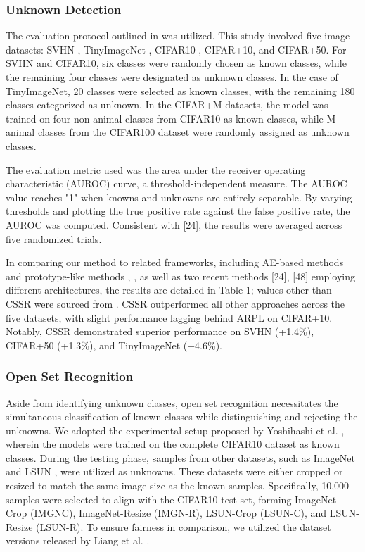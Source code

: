 \documentclass{gji}
\begin{document}
\subsubsection{Unknown Detection}
The evaluation protocol outlined in \cite{24} was utilized. This study involved five image datasets: SVHN \cite{25}, TinyImageNet \cite{30}, CIFAR10 \cite{20}, CIFAR+10, and CIFAR+50. For SVHN and CIFAR10, six classes were randomly chosen as known classes, while the remaining four classes were designated as unknown classes. In the case of TinyImageNet, 20 classes were selected as known classes, with the remaining 180 classes categorized as unknown. In the CIFAR+M datasets, the model was trained on four non-animal classes from CIFAR10 as known classes, while M animal classes from the CIFAR100 dataset \cite{20} were randomly assigned as unknown classes.

The evaluation metric used was the area under the receiver operating characteristic (AUROC) curve, a threshold-independent measure. The AUROC value reaches "1" when knowns and unknowns are entirely separable. By varying thresholds and plotting the true positive rate against the false positive rate, the AUROC was computed. Consistent with [24], the results were averaged across five randomized trials.

In comparing our method to related frameworks, including AE-based methods \cite{26} and prototype-like methods \cite{3}, \cite{42}, as well as two recent methods [24], [48] employing different architectures, the results are detailed in Table 1; values other than CSSR were sourced from \cite{48}. CSSR outperformed all other approaches across the five datasets, with slight performance lagging behind ARPL on CIFAR+10. Notably, CSSR demonstrated superior performance on SVHN (+1.4\%), CIFAR+50 (+1.3\%), and TinyImageNet (+4.6\%).

\subsubsection{Open Set Recognition}
Aside from identifying unknown classes, open set recognition necessitates the simultaneous classification of known classes while distinguishing and rejecting the unknowns. We adopted the experimental setup proposed by Yoshihashi et al. \cite{10}, wherein the models were trained on the complete CIFAR10 dataset as known classes. During the testing phase, samples from other datasets, such as ImageNet \cite{32} and LSUN \cite{44}, were utilized as unknowns. These datasets were either cropped or resized to match the same image size as the known samples. Specifically, 10,000 samples were selected to align with the CIFAR10 test set, forming ImageNet-Crop (IMGNC), ImageNet-Resize (IMGN-R), LSUN-Crop (LSUN-C), and LSUN-Resize (LSUN-R). To ensure fairness in comparison, we utilized the dataset versions released by Liang et al. \cite{22}.
\end{document}
